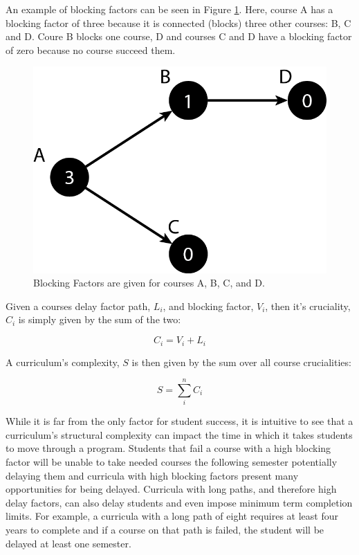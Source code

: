 \documentclass[botnum, fleqn]{unmeethesis}
\begin{document}
An example of blocking factors can be seen in Figure \ref{fig:blocking_factor_example}. Here, course A has a blocking factor of three because it is connected (blocks) three other courses: B, C and D. Coure B blocks one course, D and courses C and D have a blocking factor of zero because no course succeed them.

\begin{figure}[h!]
\centerline{\includegraphics[scale=0.4]{./figures/blocking_factor.png}}
\caption{Blocking Factors are given for courses A, B, C, and D.} 
\label{fig:blocking_factor_example}
\end{figure}

Given a courses delay factor path, \(L_i\), and blocking factor, \(V_i\), then it's cruciality, \(C_i\) is simply given by the sum of the two:

\begin{equation}
  C_{i} = V_{i} + L_{i}
\end{equation}

A curriculum's complexity, \(S\) is then given by the sum over all course crucialities:

\begin{equation}
  S = \sum_{i}^n C_{i}
\end{equation}

While it is far from the only factor for student success, it is intuitive to see that a curriculum's structural complexity can impact the time in which it takes students to move through a program. Students that fail a course with a high blocking factor will be unable to take needed courses the following semester potentially delaying them and curricula with high blocking factors present many opportunities for being delayed. Curricula with long paths, and therefore high delay factors, can also delay students and even impose minimum term completion limits. For example, a curricula with a long path of eight requires at least four years to complete and if a course on that path is failed, the student will be delayed at least one semester.
\end{document}
